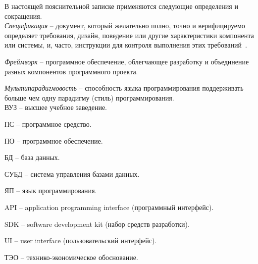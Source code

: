 \label{sec:definitions}

В настоящей пояснительной записке применяются следующие определения и сокращения.
\\

\emph{Спецификация} -- документ, который желательно полно, точно и верифицируемо определяет требования, дизайн, поведение или другие характеристики компонента или системы, и, часто, инструкции для контроля выполнения этих требований~\cite{istqb_specification}.


\emph{Фреймворк} -- программное обеспечение, облегчающее разработку и объединение разных компонентов программного проекта.

\emph{Мультипарадигмовость} -- способность языка программирования поддерживать больше чем одну парадигму (стиль) программирования.
\\

ВУЗ -- высшее учебное заведение.

ПС -- программное средство.

ПО -- программное обеспечение.

БД -- база данных.

СУБД -- система управления базами данных.

ЯП -- язык программирования.

API -- application programming interface (программный интерфейс).

SDK -- software development kit (набор средств разработки).

UI -- user interface (пользовательский интерфейс).

ТЭО -- технико-экономическое обоснование.

